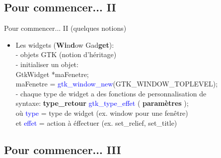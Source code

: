 \documentclass{beamer}
\begin{document}
\subsection{Pour commencer... II}

\begin{frame}{Pour commencer... II (quelques notions)}
    \begin{itemize}
    \item Les widgets (\textbf{Wi}n\textbf{d}ow Gad\textbf{get}):\\
    \hspace{0.3cm}- objets GTK (notion d'héritage)\\
    \vspace{0.1cm}
    \hspace{0.3cm}- initialiser un objet: \\
    \hspace{0.5cm} GtkWidget *maFenetre;\\
    \hspace{0.5cm} maFenetre = \textcolor{blue}{gtk\_window\_new}(GTK\_WINDOW\_TOPLEVEL);\\
    \vspace{0.1cm}
    \hspace{0.3cm}- chaque type de widget a des fonctions de personnalisation de\\
    \hspace{0.4cm}  syntaxe: \textbf{type\_retour} \textcolor{blue}{gtk\_type\_effet} ( \textbf{paramètres} ); \\
    \hspace{0.4cm} où \textcolor{blue}{type} = type de widget (ex. window pour une fenêtre)\\
    \hspace{0.4cm} et \textcolor{blue}{effet} = action à éffectuer (ex. set\_relief, set\_title)\\
    \end{itemize}
\end{frame}

\subsection{Pour commencer... III}
\end{document}
